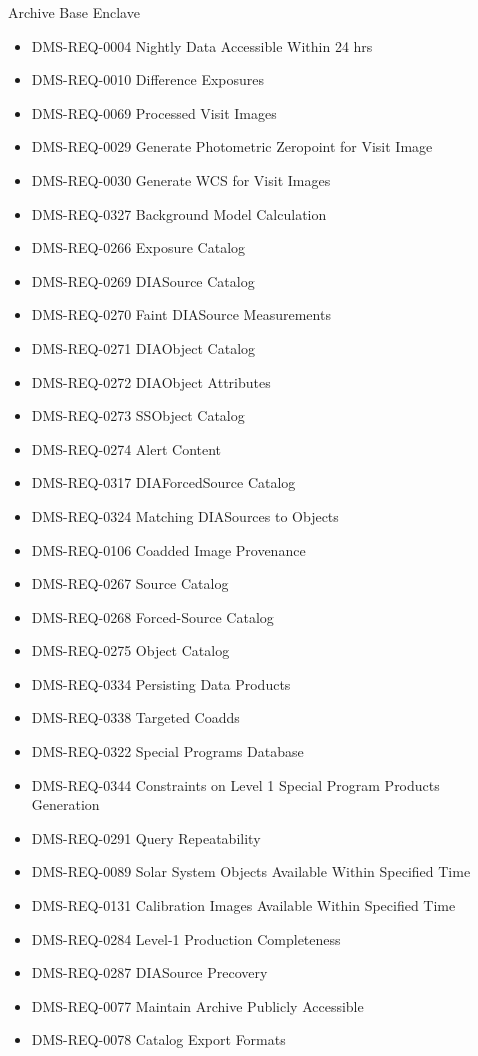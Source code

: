 Archive Base Enclave \begin{itemize}
\item DMS-REQ-0004 Nightly Data Accessible Within 24 hrs
\item DMS-REQ-0010 Difference Exposures
\item DMS-REQ-0069 Processed Visit Images
\item DMS-REQ-0029 Generate Photometric Zeropoint for Visit Image
\item DMS-REQ-0030 Generate WCS for Visit Images
\item DMS-REQ-0327 Background Model Calculation
\item DMS-REQ-0266 Exposure Catalog
\item DMS-REQ-0269 DIASource Catalog
\item DMS-REQ-0270 Faint DIASource Measurements
\item DMS-REQ-0271 DIAObject Catalog
\item DMS-REQ-0272 DIAObject Attributes
\item DMS-REQ-0273 SSObject Catalog
\item DMS-REQ-0274 Alert Content
\item DMS-REQ-0317 DIAForcedSource Catalog
\item DMS-REQ-0324 Matching DIASources to Objects
\item DMS-REQ-0106 Coadded Image Provenance
\item DMS-REQ-0267 Source Catalog
\item DMS-REQ-0268 Forced-Source Catalog
\item DMS-REQ-0275 Object Catalog
\item DMS-REQ-0334 Persisting Data Products
\item DMS-REQ-0338 Targeted Coadds
\item DMS-REQ-0322 Special Programs Database
\item DMS-REQ-0344 Constraints on Level 1 Special Program Products Generation
\item DMS-REQ-0291 Query Repeatability
\item DMS-REQ-0089 Solar System Objects Available Within Specified Time
\item DMS-REQ-0131 Calibration Images Available Within Specified Time
\item DMS-REQ-0284 Level-1 Production Completeness
\item DMS-REQ-0287 DIASource Precovery
\item DMS-REQ-0077 Maintain Archive Publicly Accessible
\item DMS-REQ-0078 Catalog Export Formats

\end{itemize}
